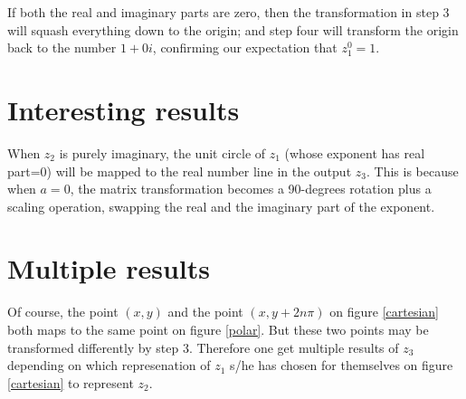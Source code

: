 \documentclass[a4paper, 12pt]{article}
\begin{document}
If both the real and imaginary parts are zero, then the transformation in step 3 will squash everything down to the origin; and step four will transform the origin back to the number $1+0i$, confirming our expectation that $z_1^0 = 1$.

\section{Interesting results}
When $z_2$ is purely imaginary, the unit circle of $z_1$ (whose exponent has real part=0) will be mapped to the real number line in the output $z_3$. This is because when $a=0$, the matrix transformation becomes a 90-degrees rotation plus a scaling operation, swapping the real and the imaginary part of the exponent.
\section{Multiple results}
Of course, the point $(x,y)$ and the point $(x, y + 2n\pi)$ on figure \ref{cartesian} both maps to the same point on figure \ref{polar}. But these two points may be transformed differently by step 3. Therefore one get multiple results of $z_3$ depending on which represenation of $z_1$ s/he has chosen for themselves on figure \ref{cartesian} to represent $z_2$.
\end{document}
